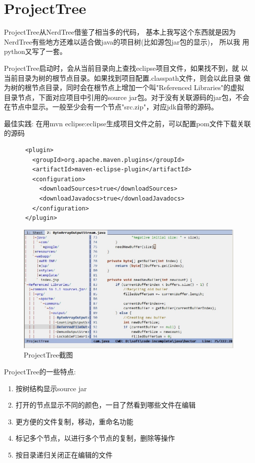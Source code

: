 \documentclass[oneside,openany]{book}
\begin{document}
\section{ProjectTree}

  ProjectTree从NerdTree借鉴了相当多的代码， 基本上我写这个东西就是因为
NerdTree有些地方还难以适合做java的项目树(比如源包jar包的显示)， 所以我
用python又写了一套。

  ProjectTree启动时，会从当前目录向上查找eclipse项目文件，如果找不到，就
以当前目录为树的根节点目录。如果找到项目配置.classpath文件，则会以此目录
做为树的根节点目录，同时会在根节点上增加一个叫"Referenced Libraries"的虚拟
目录节点，下面对应项目中引用的source jar包。对于没有关联源码的jar包，不会
在节点中显示。一般至少会有一个节点"src.zip"，对应jdk自带的源码。
  
  \begin{mdframed}[style=BestPracticeFrame]
      最佳实践: 在用mvn eclipse:eclipse生成项目文件之前，可以配置pom文件下载关联的源码
      \begin{verbatim}
      <plugin>
        <groupId>org.apache.maven.plugins</groupId>
        <artifactId>maven-eclipse-plugin</artifactId>
        <configuration>
          <downloadSources>true</downloadSources>
          <downloadJavadocs>true</downloadJavadocs>
        </configuration>
      </plugin>
      \end{verbatim}
    \end{mdframed}

  \begin{figure}[htbp]%
  \centering
  \includegraphics[scale=0.5]{tree.jpg}
  \caption{ProjectTree截图}
  \end{figure}

  ProjectTree的一些特点:
  \begin{enumerate}
    \item 按树结构显示source jar 
    \item 打开的节点显示不同的颜色，一目了然看到哪些文件在编辑
    \item 更方便的文件复制，移动，重命名功能
    \item 标记多个节点，以进行多个节点的复制，删除等操作
    \item 按目录递归关闭正在编辑的文件
  \end{enumerate}
\end{document}
